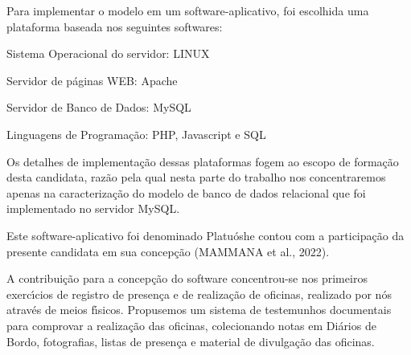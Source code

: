 \documentclass[
12pt,		%
openright,	%
twoside,  %
a4paper,			%
chapter=TITLE,		%
english,			%
french,				%
spanish,			%
brazil				%
]{USPSC-classe/USPSC}
\begin{document}
Para implementar o modelo em um software-aplicativo, foi escolhida uma plataforma baseada nos seguintes softwares:



\begin{alineas}
\item Sistema Operacional do servidor: LINUX
\item Servidor de p\'aginas WEB: Apache
\item Servidor de Banco de Dados: MySQL
\item Linguagens de Programa\c{c}\~ao: PHP, Javascript e SQL
\end{alineas}

Os detalhes de implementa\c{c}\~ao dessas plataformas fogem ao escopo de forma\c{c}\~ao desta candidata, raz\~ao pela qual nesta parte do trabalho nos concentraremos apenas na caracteriza\c{c}\~ao do modelo de banco de dados relacional que foi implementado no servidor MySQL.


Este software-aplicativo foi denominado \textquotedbl Platu\'osh\textquotedbl  e contou com a participa\c{c}\~ao da presente candidata em sua concep\c{c}\~ao  (MAMMANA et al., 2022).


A contribui\c{c}\~ao para a concep\c{c}\~ao do software concentrou-se nos primeiros exerc\'{\i}cios de registro de presen\c{c}a e de realiza\c{c}\~ao de oficinas, realizado por n\'os atrav\'es de meios f\'{\i}sicos. Propusemos um sistema de testemunhos documentais para comprovar a realiza\c{c}\~ao das oficinas, colecionando notas em Di\'arios de Bordo, fotografias, listas de presen\c{c}a e material de divulga\c{c}\~ao das oficinas.
\end{document}
